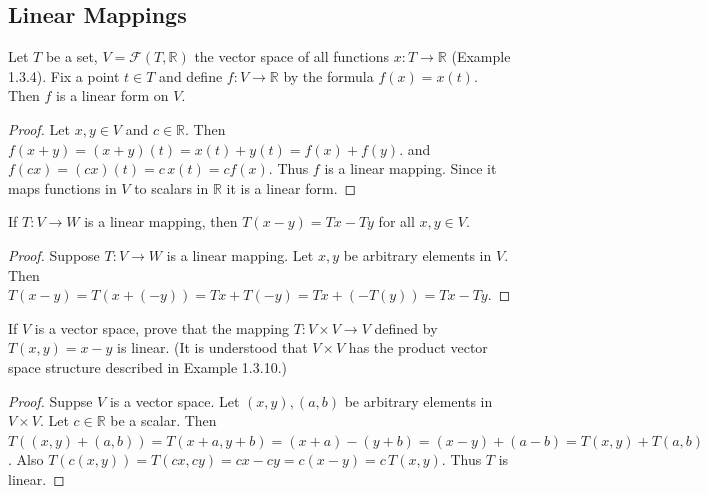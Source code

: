 \subsection{Linear Mappings}

\begin{tcolorbox}[title=Problem 2, breakable]
    Let $T$ be a set, $V = \mathcal{F}(T, \mathbb{R})$ the vector space
    of all functions $x : T \longrightarrow \mathbb{R}$
    (Example 1.3.4). Fix a point $t \in T$ and define 
    $f : V \longrightarrow \mathbb{R}$ by the formula 
    $f(x) = x(t)$. Then $f$ is a linear form on $V$.
\end{tcolorbox}

\begin{proof}
    Let $x, y \in V$ and $c \in \mathbb{R}$.  
    Then $f(x + y) = (x + y)(t) = x(t) + y(t) = f(x) + f(y)$.
    and $f(c x) = (c x)(t) = c \, x(t) = c f(x)$.
    Thus $f$ is a linear mapping. 
    Since it maps functions in $V$ to scalars in $\mathbb{R}$ it is a linear form.
\end{proof}

\begin{tcolorbox}[title=Problem 3, breakable]
    If $T : V \longrightarrow W$ is a linear mapping, then $T(x - y) = Tx - Ty$
        for all $x, y \in V$.
\end{tcolorbox}

\begin{proof}
    Suppose $T : V \longrightarrow W$ is a linear mapping.
    Let $x, y$ be arbitrary elements in $V$.
    Then $T(x - y) = T(x + (-y)) = Tx + T(-y) = Tx + (-T(y)) = Tx - Ty$.
\end{proof}

\begin{tcolorbox}[title=Problem 4, breakable]
    If $V$ is a vector space, prove that the mapping $T : V \times V \longrightarrow V$
    defined by $T(x, y) = x - y$ is linear. (It is understood that $V \times V$ has the product 
    vector space structure described in Example 1.3.10.)
\end{tcolorbox}

\begin{proof}
    Suppse $V$ is a vector space.
    Let $(x, y), (a, b)$ be arbitrary elements in $V \times V$.
    Let $c \in \mathbb{R}$ be a scalar.  
    Then $T((x, y) + (a, b)) = T(x + a, y + b) = (x + a) - (y + b) = (x - y) + (a - b) = T(x, y) + T(a, b)$.
    Also $T(c(x, y)) = T(cx, cy) = cx - cy = c(x - y) = c \, T(x, y)$.
    Thus $T$ is linear.
\end{proof}

